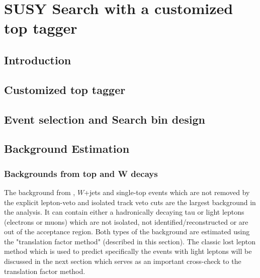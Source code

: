 \chapter{SUSY Search with a customized top tagger}

\clearpage
\section{Introduction}
\label{sec:c4intro}


\clearpage
\section{Customized top tagger}

\clearpage
\section{Event selection and Search bin design}
\label{sec:c4evssbd}


\clearpage
\section{Background Estimation}

\clearpage
\subsection{Backgrounds from top and W decays}
The background from \ttbar, $W$+jets and single-top events which are not removed by the explicit lepton-veto and isolated track veto cuts are the largest background in the analysis. It can contain either a hadronically decaying tau or light leptons (electrons or muons) which are not isolated, not identified/reconstructed or are out of the acceptance region. Both types of the background are estimated using the "translation factor method" (described in this section). The classic lost lepton method which is used to predict specifically the events with light leptons will be discussed in the next section which serves as an important cross-check to the translation factor method.

